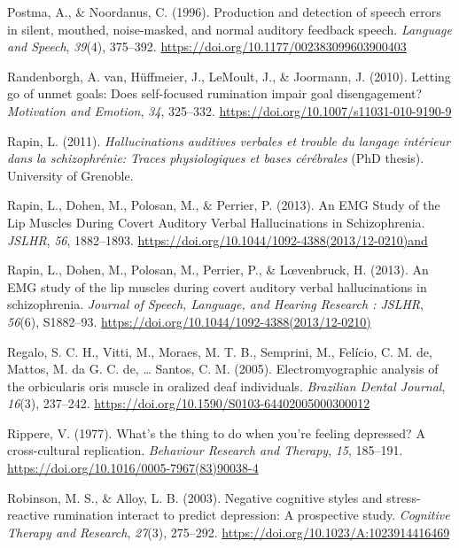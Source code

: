 \documentclass[a4paper,12pt,twoside,openright,oldfontcommands]{memoir}
\begin{document}
\hypertarget{ref-postma_production_1996}{}
Postma, A., \& Noordanus, C. (1996). Production and detection of speech
errors in silent, mouthed, noise-masked, and normal auditory feedback
speech. \emph{Language and Speech}, \emph{39}(4), 375--392.
\url{https://doi.org/10.1177/002383099603900403}

\hypertarget{ref-VanRandenborgh2010}{}
Randenborgh, A. van, Hüffmeier, J., LeMoult, J., \& Joormann, J. (2010).
Letting go of unmet goals: Does self-focused rumination impair goal
disengagement? \emph{Motivation and Emotion}, \emph{34}, 325--332.
\url{https://doi.org/10.1007/s11031-010-9190-9}

\hypertarget{ref-Rapin2011}{}
Rapin, L. (2011). \emph{Hallucinations auditives verbales et trouble du
langage intérieur dans la schizophrénie: Traces physiologiques et bases
cérébrales} (PhD thesis). University of Grenoble.

\hypertarget{ref-rapin_emg_2013}{}
Rapin, L., Dohen, M., Polosan, M., \& Perrier, P. (2013). An EMG Study
of the Lip Muscles During Covert Auditory Verbal Hallucinations in
Schizophrenia. \emph{JSLHR}, \emph{56}, 1882--1893.
\url{https://doi.org/10.1044/1092-4388(2013/12-0210)and}

\hypertarget{ref-Rapin2013}{}
Rapin, L., Dohen, M., Polosan, M., Perrier, P., \& Lœvenbruck, H.
(2013). An EMG study of the lip muscles during covert auditory verbal
hallucinations in schizophrenia. \emph{Journal of Speech, Language, and
Hearing Research : JSLHR}, \emph{56}(6), S1882--93.
\url{https://doi.org/10.1044/1092-4388(2013/12-0210)}

\hypertarget{ref-regalo_electromyographic_2005}{}
Regalo, S. C. H., Vitti, M., Moraes, M. T. B., Semprini, M., Felício, C.
M. de, Mattos, M. da G. C. de, \ldots{} Santos, C. M. (2005).
Electromyographic analysis of the orbicularis oris muscle in oralized
deaf individuals. \emph{Brazilian Dental Journal}, \emph{16}(3),
237--242. \url{https://doi.org/10.1590/S0103-64402005000300012}

\hypertarget{ref-Rippere1977}{}
Rippere, V. (1977). What's the thing to do when you're feeling
depressed? A cross-cultural replication. \emph{Behaviour Research and
Therapy}, \emph{15}, 185--191.
\url{https://doi.org/10.1016/0005-7967(83)90038-4}

\hypertarget{ref-Robinson2003}{}
Robinson, M. S., \& Alloy, L. B. (2003). Negative cognitive styles and
stress-reactive rumination interact to predict depression: A prospective
study. \emph{Cognitive Therapy and Research}, \emph{27}(3), 275--292.
\url{https://doi.org/10.1023/A:1023914416469}
\end{document}
